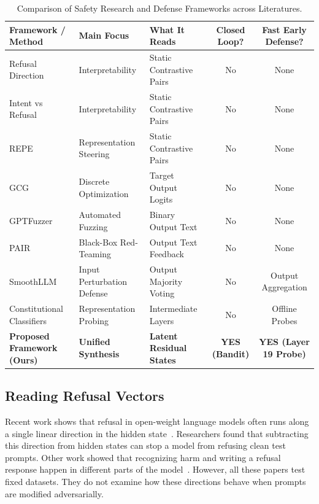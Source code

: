 \documentclass[manuscript,screen,review,anonymous]{acmart}
\begin{document}
\begin{table}[t]
  \caption{Comparison of Safety Research and Defense Frameworks across Literatures.}
  \label{tab:landscape_comparison}
  \begin{tabular}{lllcc}
    \toprule
    Framework / Method & Main Focus & What It Reads & Closed Loop? & Fast Early Defense? \\
    \midrule
    Refusal Direction~\cite{arditi2024refusal} & Interpretability & Static Contrastive Pairs & No & None \\
    Intent vs Refusal~\cite{zhao2024representation} & Interpretability & Static Contrastive Pairs & No & None \\
    REPE~\cite{zou2023representation} & Representation Steering & Static Contrastive Pairs & No & None \\
    GCG~\cite{zou2023universal} & Discrete Optimization & Target Output Logits & No & None \\
    GPTFuzzer~\cite{yu2023gptfuzzer} & Automated Fuzzing & Binary Output Text & No & None \\
    PAIR~\cite{chao2023jailbreaking} & Black-Box Red-Teaming & Output Text Feedback & No & None \\
    SmoothLLM~\cite{robey2023smoothllm} & Input Perturbation Defense & Output Majority Voting & No & Output Aggregation \\
    Constitutional Classifiers~\cite{sharma2025constitutional,cunningham2026constitutional} & Representation Probing & Intermediate Layers & No & Offline Probes \\
    \textbf{Proposed Framework (Ours)} & \textbf{Unified Synthesis} & \textbf{Latent Residual States} & \textbf{YES (Bandit)} & \textbf{YES (Layer 19 Probe)} \\
    \bottomrule
  \end{tabular}
\end{table}

\subsection{Reading Refusal Vectors}
Recent work shows that refusal in open-weight language models often runs along a single linear direction in the hidden state~\cite{arditi2024refusal,turner2023activation,nanda2023emergent}. Researchers found that subtracting this direction from hidden states can stop a model from refusing clean test prompts. Other work showed that recognizing harm and writing a refusal response happen in different parts of the model~\cite{zhao2024representation}. However, all these papers test fixed datasets. They do not examine how these directions behave when prompts are modified adversarially.
\end{document}
